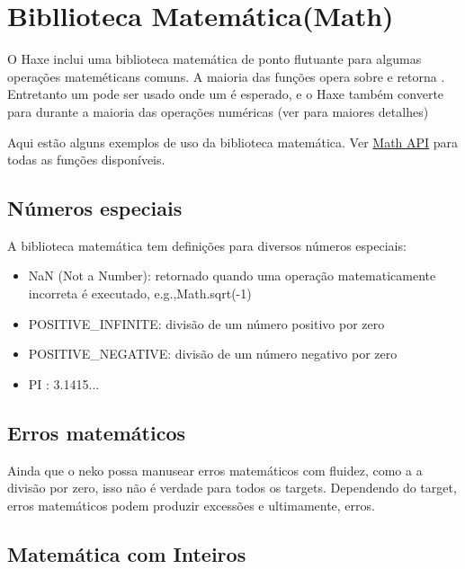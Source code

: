 {\section{Bibllioteca Matemática(Math)}
\label{std-math}

O Haxe inclui uma biblioteca matemática de ponto flutuante para algumas operações mateméticans comuns. A maioria das funções opera sobre e retorna . Entretanto um  pode ser usado onde um  é esperado, e o Haxe também converte  para  durante a maioria das operações numéricas (ver  para maiores detalhes)

Aqui estão alguns exemplos de uso da biblioteca matemática. Ver \href{http://api.haxe.org/Math.html}{Math API} para todas as funções disponíveis.


\subsection{Números especiais}
\label{std-math-special-numbers}

A biblioteca matemática tem definições para diversos números especiais:

\begin{itemize}
    \item NaN (Not a Number): retornado quando uma operação matematicamente incorreta é executado, e.g.,Math.sqrt(-1)
    \item POSITIVE_INFINITE: divisão de um número positivo por zero
    \item POSITIVE_NEGATIVE: divisão de um número negativo por zero
	\item PI : 3.1415...
\end{itemize}

\subsection{Erros matemáticos}
\label{std-math-mathematical-errors}

Ainda que o neko possa manusear erros matemáticos com fluidez, como a a divisão por zero, isso não é verdade para todos os targets. Dependendo do target, erros matemáticos podem produzir excessões e ultimamente, erros.

\subsection{Matemática com Inteiros}
\label{std-math-integer-math}

}
